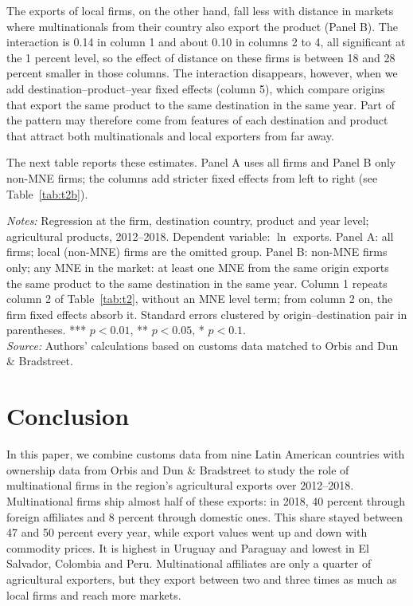 \documentclass[11pt,a4paper]{article}
\newcommand{\srcnote}{\textit{Source:} Authors' calculations based on customs data matched to Orbis and Dun \& Bradstreet.}
\begin{document}
The exports of local firms, on the other hand, fall less with distance in markets where
multinationals from their country also export the product (Panel B). The interaction is 0.14 in
column 1 and about 0.10 in columns 2 to 4, all significant at the 1 percent level, so the effect of
distance on these firms is between 18 and 28 percent smaller in those columns. The interaction
disappears, however, when we add destination--product--year fixed effects (column 5), which compare
origins that export the same product to the same destination in the same year. Part of the pattern
may therefore come from features of each destination and product that attract both multinationals
and local exporters from far away.

The next table reports these estimates. Panel A uses all firms and Panel B only non-MNE firms; the
columns add stricter fixed effects from left to right (see Table~\ref{tab:t2b}).
\begin{table}[H]\centering\small%
  \caption{Distance and Firm Agricultural Exports: Firm Fixed Effects}%
  \label{tab:t2b}%
  \par\vspace{3pt}%
  \begin{minipage}{0.95\textwidth}\footnotesize %
  \textit{Notes:} Regression at the firm, destination country, product and year level; agricultural products, 2012--2018. Dependent variable: $\ln$ exports. Panel A: all firms; local (non-MNE) firms are the omitted group. Panel B: non-MNE firms only; any MNE in the market: at least one MNE from the same origin exports the same product to the same destination in the same year. Column 1 repeats column 2 of Table~\ref{tab:t2}, without an MNE level term; from column 2 on, the firm fixed effects absorb it. Standard errors clustered by origin--destination pair in parentheses. *** $p<0.01$, ** $p<0.05$, * $p<0.1$.\\[3pt]%
  \srcnote%
  \end{minipage}%
  \end{table}

\section{Conclusion}\label{sec:concl}
In this paper, we combine customs data from nine Latin American countries with ownership data from
Orbis and Dun \& Bradstreet to study the role of multinational firms in the region's agricultural
exports over 2012--2018. Multinational firms ship almost half of these exports: in 2018, 40 percent
through foreign affiliates and 8 percent through domestic ones. This share stayed between 47 and 50
percent every year, while export values went up and down with commodity prices. It is highest in
Uruguay and Paraguay and lowest in El Salvador, Colombia and Peru. Multinational affiliates are only
a quarter of agricultural exporters, but they export between two and three times as much as local
firms and reach more markets.
\end{document}
